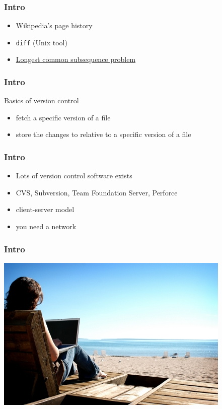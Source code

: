 \documentclass[%
        hyperref={%
                pdfauthor={Zakariyya Mughal},%
                pdfpagemode={None},pdfpagelayout={SinglePage}}%
        xcolor={x11names},%
]{beamer}
\begin{document}
\begin{frame}
\frametitle{Intro}
\begin{itemize}
	\item [] Wikipedia's page history
	\pause \item [] \texttt{diff} (Unix tool)
	\pause \item [] \href{https://en.wikipedia.org/wiki/Longest_common_subsequence_problem}{Longest common subsequence problem}
\end{itemize}
\end{frame}

\begin{frame}
\frametitle{Intro}
Basics of version control
\begin{itemize}
	\item [] fetch a specific version of a file
	\pause \item [] store the changes to relative to a specific version of a file
\end{itemize}
\end{frame}

\begin{frame}
\frametitle{Intro}
\begin{itemize}
	\item [] Lots of version control software exists
	\pause \item []\qquad CVS, Subversion, Team Foundation Server, Perforce
	\pause \item []\qquad\qquad client-server model
	\pause \item []\qquad\qquad you need a network
\end{itemize}
\end{frame}

\begin{frame}
\frametitle{Intro}
\includegraphics[width=\textwidth]{gfx/laptop-beach.jpg}
\end{frame}
\end{document}
